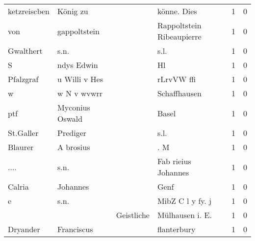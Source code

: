 \begin{tabular}{llllrr}
             ketzreiscben &                           König zu &             &                                 könne. Dies &          1 &         0 \\
                      von &                       gappoltstein &             &                   Rappoltstein Ribeaupierre &          1 &         0 \\
                Gwalthert &                               s.n. &             &                                        s.l. &          1 &         0 \\
                        S &                         ndys Edwin &             &                                          Hl &          1 &         0 \\
                Pfalzgraf &                      u Willi v Hes &             &                                  rLrvVW ffi &          1 &         0 \\
                        w &                        w N v wvwrr &             &                                Schaffhausen &          1 &         0 \\
                      ptf &                    Myconius Oswald &             &                                       Basel &          1 &         0 \\
                St.Galler &                           Prediger &             &                                        s.l. &          1 &         0 \\
                  Blaurer &                          A brosius &             &                                         . M &          1 &         0 \\
                     .... &                               s.n. &             &                         Fab rieius Johannes &          1 &         0 \\
                   Calria &                           Johannes &             &                                        Genf &          1 &         0 \\
                        e &                               s.n. &             &                            MibZ C l y fy. j &          1 &         0 \\
                          &                                    &  Geistliche &                            Mülhausen i. E.  &          1 &         0 \\
                 Dryander &                         Franciscus &             &                                 flanterbury &          1 &         0 \\

\end{tabular}
